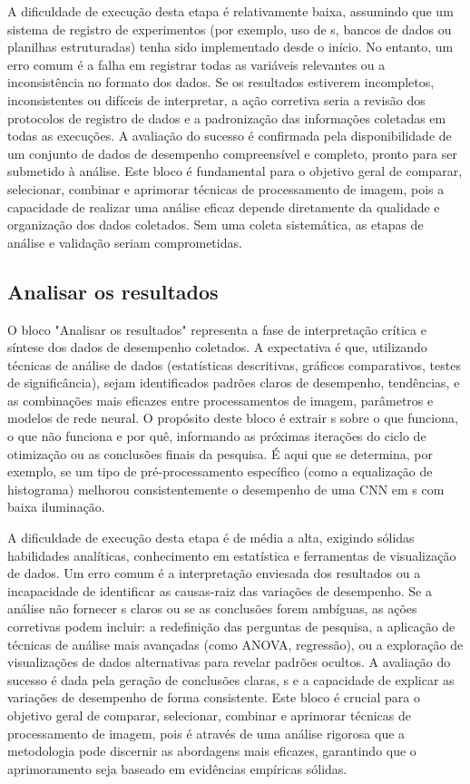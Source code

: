 A dificuldade de execução desta etapa é relativamente baixa, assumindo que um sistema de registro de experimentos (por exemplo, uso de s, bancos de dados ou planilhas estruturadas) tenha sido implementado desde o início. No entanto, um erro comum é a falha em registrar todas as variáveis relevantes ou a inconsistência no formato dos dados. Se os resultados estiverem incompletos, inconsistentes ou difíceis de interpretar, a ação corretiva seria a revisão dos protocolos de registro de dados e a padronização das informações coletadas em todas as execuções. A avaliação do sucesso é confirmada pela disponibilidade de um conjunto de dados de desempenho compreensível e completo, pronto para ser submetido à análise. Este bloco é fundamental para o objetivo geral de comparar, selecionar, combinar e aprimorar técnicas de processamento de imagem, pois a capacidade de realizar uma análise eficaz depende diretamente da qualidade e organização dos dados coletados. Sem uma coleta sistemática, as etapas de análise e validação seriam comprometidas.

\subsection{Analisar os resultados}
O bloco "Analisar os resultados" representa a fase de interpretação crítica e síntese dos dados de desempenho coletados. A expectativa é que, utilizando técnicas de análise de dados (estatísticas descritivas, gráficos comparativos, testes de significância), sejam identificados padrões claros de desempenho, tendências, e as combinações mais eficazes entre processamentos de imagem, parâmetros e modelos de rede neural. O propósito deste bloco é extrair s sobre o que funciona, o que não funciona e por quê, informando as próximas iterações do ciclo de otimização ou as conclusões finais da pesquisa. É aqui que se determina, por exemplo, se um tipo de pré-processamento específico (como a equalização de histograma) melhorou consistentemente o desempenho de uma CNN em s com baixa iluminação.

A dificuldade de execução desta etapa é de média a alta, exigindo sólidas habilidades analíticas, conhecimento em estatística e ferramentas de visualização de dados. Um erro comum é a interpretação enviesada dos resultados ou a incapacidade de identificar as causas-raiz das variações de desempenho. Se a análise não fornecer s claros ou se as conclusões forem ambíguas, as ações corretivas podem incluir: a redefinição das perguntas de pesquisa, a aplicação de técnicas de análise mais avançadas (como ANOVA, regressão), ou a exploração de visualizações de dados alternativas para revelar padrões ocultos. A avaliação do sucesso é dada pela geração de conclusões claras, s e a capacidade de explicar as variações de desempenho de forma consistente. Este bloco é crucial para o objetivo geral de comparar, selecionar, combinar e aprimorar técnicas de processamento de imagem, pois é através de uma análise rigorosa que a metodologia pode discernir as abordagens mais eficazes, garantindo que o aprimoramento seja baseado em evidências empíricas sólidas.

